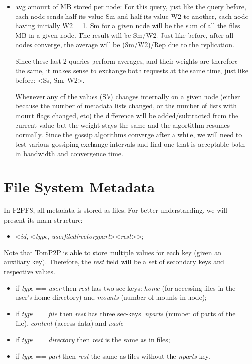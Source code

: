 \documentclass[times,9pt,article]{llncs}
\begin{document}
\begin{itemize}
\item avg amount of MB stored per node:
For this query, just like the query before, each node sends half its value Sm and 
half its value W2 to another, each node having initially W2 = 1. Sm for a given node
will be the sum of all the files MB in a given node. The result will be Sm/W2. Just
like before, after all nodes converge, the average will be (Sm/W2)/Rep due to the 
replication.

Since these last 2 queries perform averages, and their weights are therefore the same,
it makes sense to exchange both requests at the same time, just like before:
\textless Ss, Sm, W2\textgreater.

Whenever any of the values (S's) changes internally on a given node (either because
the number of metadata lists changed, or the number of lists with mount flags changed,
etc) the difference will be added/subtracted from the current value but the weight 
stays the same and the algortithm resumes normally.
Since the gossip algorithms converge after a while, we will need to test various
gossiping exchange intervals and find one that is acceptable both in bandwidth and
convergence time.

\end{itemize} 

\section{File System Metadata}


In P2PFS, all metadata is stored as files. For better understanding, we will
present its main structure:
\begin{itemize}
\item \textless \emph{id}, \textless \emph{type}, \emph{user}\textbar \emph{file}\textbar \emph{directory}\textbar \emph{part}\textgreater \textless \emph{rest}\textgreater\textgreater ;
\end{itemize}

Note that TomP2P is able to store multiple values for each key (given an 
auxiliary key). Therefore, the \emph{rest} field will be a set of secondary
keys and respective values.

\begin{itemize}
\item if \emph{type} == \emph{user} then \emph{rest} has two sec-keys: \emph{home} (for accessing files in the user's home directory) and \emph{mounts} (number of mounts in node);
\item if \emph{type} == \emph{file} then \emph{rest} has three sec-keys: \emph{nparts} (number of parts of the file), \emph{content} (access data) and \emph{hash};
\item if \emph{type} == \emph{directory} then \emph{rest} is the same as in files;
\item if \emph{type} == \emph{part} then \emph{rest} the same as files without the \emph{nparts} key.
\end{itemize}
\end{document}

